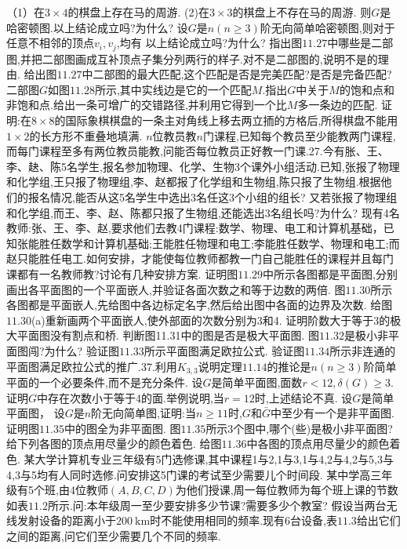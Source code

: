 （1）在$3\times4$的棋盘上存在马的周游.
(2)在$3\times3$的棋盘上不存在马的周游.
则$G$是哈密顿图.以上结论成立吗?为什么?
设$G$是$n(n\geqslant3)$阶无向简单哈密顿图,则对于任意不相邻的顶点$v_{i},v_{j}$,均有
以上结论成立吗?为什么?
指出图$11.27$中哪些是二部图,并把二部图画成互补顶点子集分列两行的样子.对不是二部图的,说明不是的理由.
给出图$11.27$中二部图的最大匹配,这个匹配是否是完美匹配?是否是完备匹配?
二部图$G$如图$11.28$所示,其中实线边是它的一个匹配$M$.指出$G$中关于$M$的饱和点和非饱和点.给出一条可增广的交错路径,并利用它得到一个比$M$多一条边的匹配.
证明:在$8\times8$的国际象棋棋盘的一条主对角线上移去两立㧫的方格后,所得棋盘不能用$1\times2$的长方形不重叠地填满.
$n$位教员教$n$门课程,已知每个教员至少能教两门课程,而每门课程至多有两位教员能教,问能否每位教员正好教一门课.27.今有胀、王、李、赽、陈5名学生,报名参加物理、化学、生物3个课外小组活动.已知,张报了物理和化学组,王只报了物理组,李、赵都报了化学组和生物组,陈只报了生物组.根据他们的报名情况,能否从这5名学生中选出3名任这3个小组的组长?
又若张报了物理组和化学组,而王、李、赵、陈都只报了生物组,还能选出3名组长吗?为什么?
现有4名教师:张、王、李、赵,要求他们去教4门课程:数学、物理、电工和计算机基础，已知张能胜任数学和计算机基础;王能胜任物理和电工;李能胜任数学、物理和电工;而赵只能胜任电工.如何安排，才能使每位教师都教一门自己能胜任的课程并且每门课都有一名教师教?讨论有几种安排方案.
证明图$11.29$中所示各图都是平面图,分别画出各平面图的一个平面嵌人,并验证各面次数之和等于边数的两倍.
图$11.30$所示各图都是平面嵌人,先给图中各边标定名字,然后给出图中各面的边界及次数.
给图$11.30$(a)重新画两个平面嵌人,使外部面的次数分别为3和4.
证明阶数大于等于3的极大平面图没有割点和桥.
判断图11.31中的图是否是极大平面图.
图$11.32$是极小非平面图闯?为什么?
验证图$11.33$所示平面图满足欧拉公式.
验证图$11.34$所示非连通的平面图满足欧拉公式的推广.37.利用$K_{3,3}$说明定理$11.14$的推论是$n(n\geqslant3)$阶简单平面的一个必要条件,而不是充分条件.
设$G$是简单平面图,面数$r<12,\delta(G)\geqslant3$.证明$G$中存在次数小于等于4的面.举例说明,当$r=12$时,上述结论不真.
设$G$是简单平面图，
设$G$是$n$阶无向简单图,证明:当$n\geqslant11$时,$G$和$\bar{G}$中至少有一个是非平面图.
证明图$11.35$中的图全为非平面图.
图$11.35$所示3个图中,哪个(些)是极小非平面图?
给下列各图的顶点用尽量少的颜色着色.
给图$11.36$中各图的顶点用尽量少的颜色着色.
某大学计算机专业三年级有5门选修课,其中课程1与2,1与3,1与4,2与4,2与5,3与4,3与5均有人同时选修.问安排这5门课的考试至少需要儿个时间段.
某中学高三年级有5个班,由4位教师$(A,B,C,D)$为他们授课,周一每位教师为每个班上课的节数如表$11.2$所示.问:本年级周一至少要安排多少节课?需要多少个教室?
假设当两台无线发射设备的距离小于$200\mathrm{~km}$时不能使用相同的频率.现有6台设备,表$11.3$给出它们之间的距离,问它们至少需要几个不同的频率.
